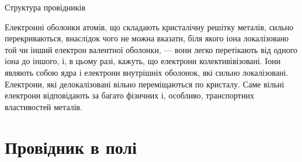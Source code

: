\documentclass[onlytextwidth]{beamer}
\begin{document}
\begin{frame}[fragile]{Структура провідників}{}
\begin{center}
\begin{tikzpicture}[>=latex]
		\end{tikzpicture}
	\end{center}

	\begin{block}{}\justifying\small
		Електронні оболонки атомів, що складають кристалічну решітку металів, сильно
		перекриваються, внаслідок чого не можна вказати, біля якого іона локалізовано той чи інший
		\alert{електрон валентної оболонки}, --- вони легко перетікають від одного іона до іншого,
		і, в цьому разі, кажуть, що \alert{електрони колективівізовані}. Іони являють собою ядра і
		електрони внутрішніх оболонок, які сильно локалізовані. Електрони, які делокалізовані
		вільно переміщаються по кристалу. Саме вільні електрони відповідають за багато фізичних і,
		особливо, транспортних властивостей металів.
	\end{block}

\end{frame}




\section{Провідник в полі}
\end{document}
